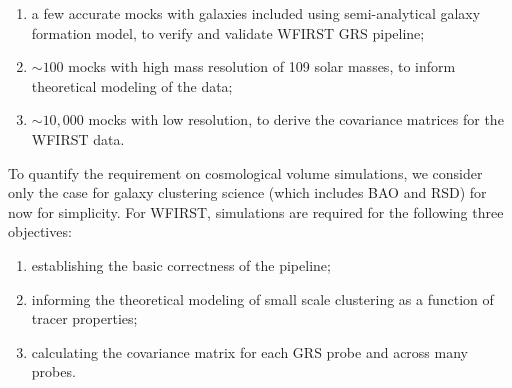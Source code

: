  \begin{enumerate}
 \item a few accurate mocks with galaxies included using semi-analytical
 galaxy formation model, to verify and validate WFIRST GRS pipeline;
 \item $\sim 100$ mocks with high mass resolution of 109 solar masses, to inform theoretical modeling of the data;
 \item $\sim 10,000$ mocks with low resolution, to derive the covariance matrices for the WFIRST data.
 \end{enumerate}

 To quantify the requirement on cosmological volume simulations, we consider only
 the case for galaxy clustering science (which includes BAO and RSD) for now for
 simplicity. For WFIRST, simulations are required for the following three
 objectives:
\begin{enumerate}
\item establishing the basic correctness of the pipeline;
\item informing the theoretical modeling of small scale clustering as a function of
 tracer properties;
 \item calculating the covariance matrix for each GRS probe and
 across many probes.
 \end{enumerate}

